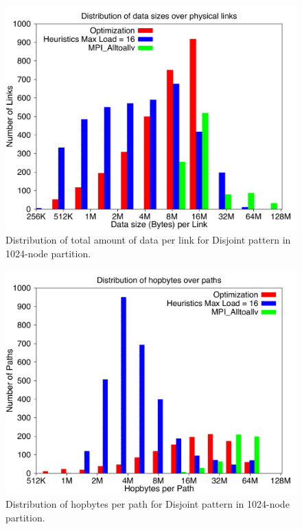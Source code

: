 \begin{figure}[!htb]
\vspace{-0.1in}
\centering
\includegraphics[scale=0.30]{figures/loaddata_histo.pdf}
\vspace{-0.1in}
\caption{Distribution of total amount of data per link for Disjoint pattern in 1024-node partition.}
\vspace{-0.1in}
\label{fig:loaddata_histo}
\end{figure}

\begin{figure}[!htb]
\vspace{-0.1in}
\centering
\includegraphics[scale=0.30]{figures/hopbyte_histo.pdf}
\vspace{-0.1in}
\caption{Distribution of hopbytes per path for Disjoint pattern in 1024-node partition.}
\vspace{-0.1in}
\label{fig:hopbyte_histo}
\end{figure}
